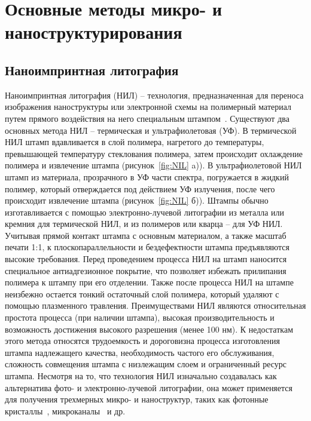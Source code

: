 \section{Основные методы микро- и наноструктурирования}

\subsection{Наноимпринтная литография}
Наноимпринтная литография (НИЛ) -- технология, предназначенная для переноса изображения наноструктуры или электронной схемы на полимерный материал путем прямого воздействия на него специальным штампом~\cite{NIL_1, NIL_2}. Существуют два основных метода НИЛ -- термическая и ультрафиолетовая (УФ). В термической НИЛ штамп вдавливается в слой полимера, нагретого до температуры, превышающей температуру стеклования полимера, затем происходит охлаждение полимера и извлечение штампа (рисунок~\ref{fig:NIL} a)). В ультрафиолетовой НИЛ штамп из материала, прозрачного в УФ части спектра, погружается в жидкий полимер, который отверждается под действием УФ излучения, после чего происходит извлечение штампа (рисунок~\ref{fig:NIL} б)). Штампы обычно изготавливается с помощью электронно-лучевой литографии из металла или кремния для термической НИЛ, и из полимеров или кварца -- для УФ НИЛ. Учитывая прямой контакт штампа с основным материалом, а также масштаб печати 1:1, к плоскопараллельности и бездефектности штампа предъявляются высокие требования.  Перед проведением процесса НИЛ на штамп наносится специальное антиадгезионное покрытие, что позволяет избежать прилипания полимера к штампу при его отделении. Также после процесса НИЛ на штампе неизбежно остается тонкий остаточный слой полимера, который удаляют с помощью плазменного травления. Преимуществами НИЛ являются относительная простота процесса (при наличии штампа), высокая производительность и возможность достижения высокого разрешения (менее 100 нм). К недостаткам этого метода относятся трудоемкость и дороговизна процесса изготовления штампа надлежащего качества, необходимость частого его обслуживания, сложность совмещения штампа с низлежащим слоем и ограниченный ресурс штампа. Несмотря на то, что технология НИЛ изначально создавалась как альтернатива фото- и электронно-лучевой литографии, она может применяется для получения трехмерных микро- и наноструктур, таких как фотонные кристаллы~\cite{NIL_nanophotonics}, микроканалы~\cite{NIL_microfluidics} и \linebreak др.~\cite{NIL_3D_1, NIL_3D_2}

